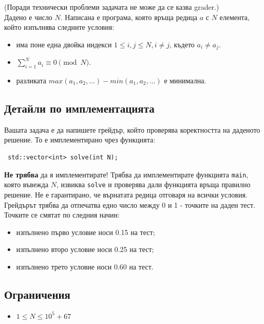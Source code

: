 \documentclass[12pt]{article}
\begin{document}
\renewcommand{\round}{Ден 2}
\renewcommand{\problemName}{Задача Грейдър67}
\renewcommand{\lang}{Български}

\renewcommand{\tl}{$0.1$ sec.}
\renewcommand{\ml}{$256$ MB}
\problem{\problemName}
(Поради технически проблеми задачата не може да се казва grader.)\\
Дадено е число $N$. Написана е програма, която връща редица $a$ с $N$ елемента, който изпълнява следните условия:
\begin{itemize}
    \item има поне една двойка индекси $1 \leq i,j \leq N, i \neq j$, където $a_i \neq a_j$.
	\item $\sum_{i=1}^{N} a_i \equiv 0 \pmod{N}$.
	\item разликата $max(a_1, a_2, ...) - min(a_1, a_2, ...)$ е минимална.
\end{itemize}
\subsection{Детайли по имплементацията}
Вашата задача е да напишете грейдър, който проверява коректността на даденото решение. То е имплементирано чрез функцията:
\begin{lstlisting}
 std::vector<int> solve(int N);
\end{lstlisting}
\textbf{Не трябва} да я имплементирате! Трябва да имплементирате функцията \texttt{main}, която въвежда $N$, извиква \texttt{solve} и проверява дали функцията връща правилно решение. Не е гарантирано, че върнатата редица отговаря на всички условия. Грейдърът трябва да отпечатва едно число между 0 и 1 - точките на даден тест. Точките се смятат по следния начин:
\begin{itemize}
    \item изпълнено първо условие носи 0.15 на тест;
	\item изпълнено второ условие носи 0.25 на тест;
	\item изпълнено трето условие носи 0.60 на тест.
\end{itemize}

\subsection{Ограничения}
\begin{itemize}
\item $1 \leq N \leq 10^5+67$
\end{itemize}
\end{document}
